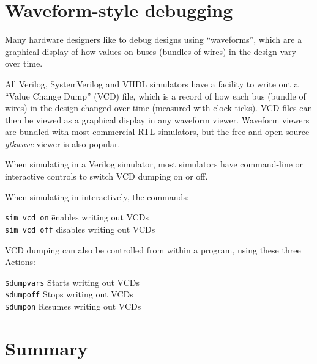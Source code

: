 
\section{Waveform-style debugging}


Many hardware designers like to debug designs using ``waveforms'',
which are a graphical display of how values on buses (bundles of
wires) in the design vary over time.

All Verilog, SystemVerilog and VHDL simulators have a facility to
write out a ``Value Change Dump'' (VCD) file, which is a record of how
each bus (bundle of wires) in the design changed over time (measured
with clock ticks).  VCD files can then be viewed as a graphical
display in any waveform viewer.  Waveform viewers are bundled with
most commercial RTL simulators, but the free and open-source
\emph{gtkwave} viewer is also popular.

When simulating in a Verilog simulator, most simulators have
command-line or interactive controls to switch VCD dumping on or off.

When simulating in {\BLUESIM} interactively, the commands:

\begin{tabbing}
\hmmmm \= {\tt sim vcd on}  \hmm \= enables writing out VCDs \\
       \> {\tt sim vcd off}      \> disables  writing out VCDs
\end{tabbing}

VCD dumping can also be controlled from within a {\BSV} program, using
these three Actions:

\begin{tabbing}
\hmmmm \= {\tt \$dumpvars} \hmm \= Starts writing out VCDs \\
       \> {\tt \$dumpoff}       \> Stops  writing out VCDs \\
       \> {\tt \$dumpon}        \> Resumes writing out VCDs
\end{tabbing}


\section{Summary}


